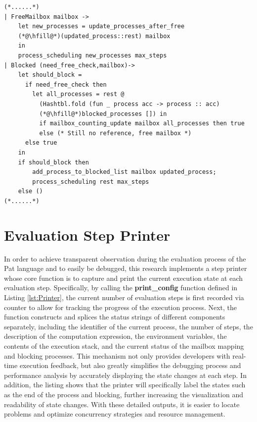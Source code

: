 \documentclass{l4proj}
\begin{document}
\noindent\begin{minipage}{\linewidth}
\lstset{style=Ocamlstyle,}
\begin{lstlisting}[caption={Mailbox Free and Process Blocking}, label={lst:blockfree}]
(*......*)
| FreeMailbox mailbox -> 
    let new_processes = update_processes_after_free 
    (*@\hfill@*)(updated_process::rest) mailbox 
    in
    process_scheduling new_processes max_steps
| Blocked (need_free_check,mailbox)->
    let should_block = 
      if need_free_check then
        let all_processes = rest @
          (Hashtbl.fold (fun _ process acc -> process :: acc) 
          (*@\hfill@*)blocked_processes []) in
          if mailbox_counting_update mailbox all_processes then true
          else (* Still no reference, free mailbox *)
      else true
    in
    if should_block then
        add_process_to_blocked_list mailbox updated_process;
        process_scheduling rest max_steps
    else ()
(*......*)
\end{lstlisting}
\end{minipage}

\section{Evaluation Step Printer}

In order to achieve transparent observation during the evaluation process of the Pat language and to easily be debugged, this research implements a step printer whose core function is to capture and print the current execution state at each evaluation step. Specifically, by calling the \textbf{print\_config} function defined in Listing \ref{lst:Printer}, the current number of evaluation steps is first recorded via counter to allow for tracking the progress of the execution process. Next, the function constructs and splices the status strings of different components separately, including the identifier of the current process, the number of steps, the description of the computation expression, the environment variables, the contents of the execution stack, and the current status of the mailbox mapping and blocking processes. This mechanism not only provides developers with real-time execution feedback, but also greatly simplifies the debugging process and performance analysis by accurately displaying the state changes at each step. In addition, the listing shows that the printer will specifically label the states such as the end of the process and blocking, further increasing the visualization and readability of state changes. With these detailed outputs, it is easier to locate problems and optimize concurrency strategies and resource management.
\end{document}
